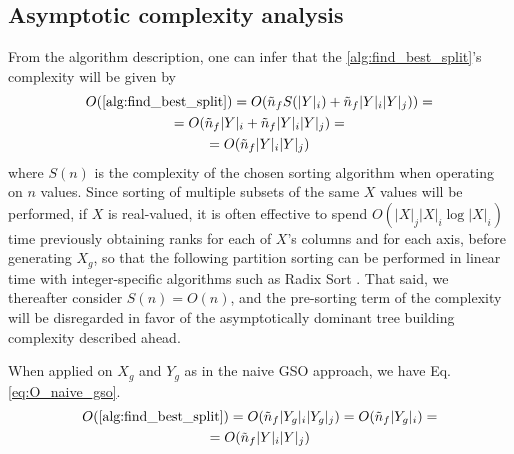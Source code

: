 

\subsection{Asymptotic complexity analysis}
\label{sec:complexity_analysis}

From the algorithm description, one can infer that the \ref{alg:find_best_split}'s complexity will be given by
%
\begin{multline}
    O(\ref{alg:find_best_split}) = O(\tilde n_f S(|Y|_i) + \tilde n_f |Y|_i|Y|_j))=\\
    = O(\tilde n_f |Y|_i + \tilde n_f |Y|_i|Y|_j) =\\
    = O(\tilde n_f |Y|_i|Y|_j)
\end{multline}
where $S(n)$ is the complexity of the chosen sorting algorithm when operating on $n$ values. Since sorting of multiple subsets of the same $X$ values will be performed, if $X$ is real-valued, it is often effective to spend $O(|X|_j|X|_i\log |X|_i)$ time previously obtaining ranks for each of $X$'s columns and for each axis, before generating $X_g$, so that the following partition sorting can be performed in linear time with integer-specific algorithms such as Radix Sort \cite{}. That said, we thereafter consider $S(n) = O(n)$, and the pre-sorting term of the complexity will be disregarded in favor of the asymptotically dominant tree building complexity described ahead.

When applied on $X_g$ and $Y_g$ as in the naive GSO approach, we have Eq. \ref{eq:O_naive_gso}.
%
\begin{multline}
    O(\ref{alg:find_best_split}) = O(\tilde n_f |Y_g|_i|Y_g|_j)
    = O(\tilde n_f |Y_g|_i) =\\
    = O(\tilde n_f |Y|_i|Y|_j)
    \label{eq:O_naive_gso}
\end{multline}

